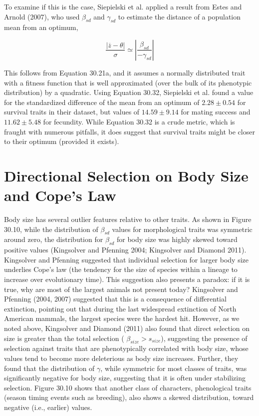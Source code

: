 \documentclass{article}
\begin{document}
To examine if this is the case, Siepielski et al. applied a result from Estes and Arnold (2007), who used  $ \beta_{sd} $ and  $ \gamma_{sd} $ to estimate the distance of a population mean from an optimum,

\begin{equation}
\frac{\left|\overline{z}-\theta\right|}{\sigma}\simeq\left|\frac{\beta_{sd}}{-\gamma_{sd}}\right|
\tag{30.32}
\label{eq:30_32}
\end{equation}

This follows from Equation 30.21a, and it assumes a normally distributed trait with a fitness function that is well approximated (over the bulk of its phenotypic distribution) by a quadratic. Using Equation 30.32, Siepielski et al. found a value for the standardized difference of the mean from an optimum of  $ 2.28 \pm 0.54 $ for survival traits in their dataset, but values of  $ 14.59 \pm 9.14 $ for mating success and  $ 11.62 \pm 5.48 $ for fecundity. While Equation 30.32 is a crude metric, which is fraught with numerous pitfalls, it does suggest that survival traits might be closer to their optimum (provided it exists).

\section{Directional Selection on Body Size and Cope's Law}
Body size has several outlier features relative to other traits. As shown in Figure 30.10, while the distribution of  $ \beta_{sd} $ values for morphological traits was symmetric around zero, the distribution for  $ \beta_{sd} $ for body size was highly skewed toward positive values (Kingsolver and Pfenning 2004; Kingsolver and Diamond 2011). Kingsolver and Pfenning suggested that individual selection for larger body size underlies Cope's law (the tendency for the size of species within a lineage to increase over evolutionary time). This suggestion also presents a paradox: if it is true, why are most of the largest animals not present today? Kingsolver and Pfenning (2004, 2007) suggested that this is a consequence of differential extinction, pointing out that during the last widespread extinction of North American mammals, the largest species were the hardest hit. However, as we noted above, Kingsolver and Diamond (2011) also found that direct selection on size is greater than the total selection ( $ \beta_{size} > s_{size} $), suggesting the presence of selection against traits that are phenotypically correlated with body size, whose values tend to become more deleterious as body size increases. Further, they found that the distribution of  $ \gamma $, while symmetric for most classes of traits, was significantly negative for body size, suggesting that it is often under stabilizing selection. Figure 30.10 shows that another class of characters, phenological traits (season timing events such as breeding), also shows a skewed distribution, toward negative (i.e., earlier) values.
\end{document}
